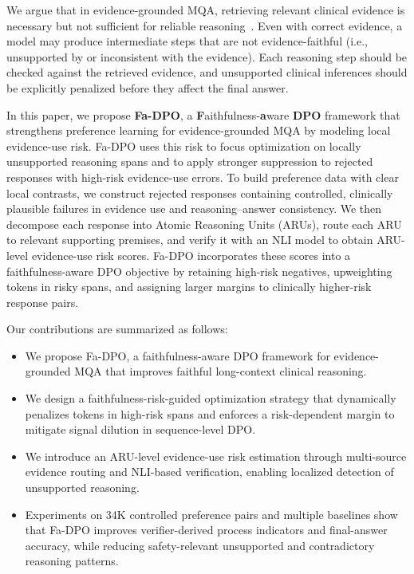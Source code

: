 \documentclass[a4paper,fleqn,doubleblind]{cas-sc}
\begin{document}
We argue that in evidence-grounded MQA, retrieving relevant clinical evidence is necessary but not sufficient for reliable reasoning~\cite{adlakha2024evaluating, li2025mdmqa, saadfalcon2024ares, li2026evidencerag, ipm2026s2cr}.
Even with correct evidence, a model may produce intermediate steps that are not evidence-faithful (i.e., unsupported by or inconsistent with the evidence).
Each reasoning step should be checked against the retrieved evidence, and unsupported clinical inferences should be explicitly penalized before they affect the final answer.

In this paper, we propose \textbf{Fa-DPO}, a \textbf{F}aithfulness-\textbf{a}ware \textbf{DPO} framework that strengthens preference learning for evidence-grounded MQA by modeling local evidence-use risk.
Fa-DPO uses this risk to focus optimization on locally unsupported reasoning spans and to apply stronger suppression to rejected responses with high-risk evidence-use errors.
To build preference data with clear local contrasts, we construct rejected responses containing controlled, clinically plausible failures in evidence use and reasoning--answer consistency.
We then decompose each response into Atomic Reasoning Units (ARUs), route each ARU to relevant supporting premises, and verify it with an NLI model to obtain ARU-level evidence-use risk scores.
Fa-DPO incorporates these scores into a faithfulness-aware DPO objective by retaining high-risk negatives, upweighting tokens in risky spans, and assigning larger margins to clinically higher-risk response pairs.


Our contributions are summarized as follows:
\begin{itemize}[noitemsep]
\item We propose Fa-DPO, a faithfulness-aware DPO framework for evidence-grounded MQA that improves faithful long-context clinical reasoning.
\item We design a faithfulness-risk-guided optimization strategy that dynamically penalizes tokens in high-risk spans and enforces a risk-dependent margin to mitigate signal dilution in sequence-level DPO.
\item We introduce an ARU-level evidence-use risk estimation through multi-source evidence routing and NLI-based verification, enabling localized detection of unsupported reasoning.
\item Experiments on 34K controlled preference pairs and multiple baselines show that Fa-DPO improves verifier-derived process indicators and final-answer accuracy, while reducing safety-relevant unsupported and contradictory reasoning patterns.
\end{itemize}
\end{document}
